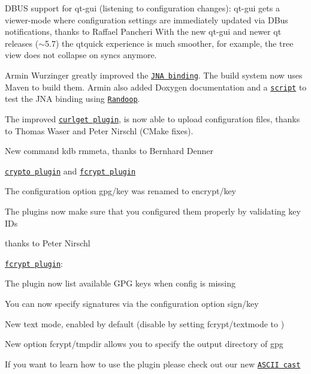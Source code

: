 \begin{DoxyItemize}
\item D\+B\+US support for qt-\/gui (listening to configuration changes)\+: qt-\/gui gets a viewer-\/mode where configuration settings are immediately updated via D\+Bus notifications, thanks to Raffael Pancheri With the new qt-\/gui and newer qt releases ($\sim$5.7) the qtquick experience is much smoother, for example, the tree view does not collapse on syncs anymore.
\item Armin Wurzinger greatly improved the \href{https://www.libelektra.org/bindings/jna}{\tt J\+NA binding}. The build system now uses Maven to build them. Armin also added Doxygen documentation and a \href{http://master.libelektra.org/scripts/randoop/randoop.in}{\tt script} to test the J\+NA binding using \href{https://randoop.github.io/randoop}{\tt Randoop}.
\item The improved \href{https://www.libelektra.org/plugins/curlget}{\tt curlget plugin}, is now able to upload configuration files, thanks to Thomas Waser and Peter Nirschl (C\+Make fixes).
\item New command {\ttfamily kdb rmmeta}, thanks to Bernhard Denner
\item \href{https://www.libelektra.org/plugins/crypto}{\tt crypto plugin} and \href{https://www.libelektra.org/plugins/fcrypt}{\tt fcrypt plugin}
\begin{DoxyItemize}
\item The configuration option {\ttfamily gpg/key} was renamed to {\ttfamily encrypt/key}
\item The plugins now make sure that you configured them properly by validating key I\+Ds
\item thanks to Peter Nirschl
\end{DoxyItemize}
\item \href{https://www.libelektra.org/plugins/fcrypt}{\tt fcrypt plugin}\+:
\begin{DoxyItemize}
\item The plugin now list available G\+PG keys when config is missing
\item You can now specify signatures via the configuration option {\ttfamily sign/key}
\item New text mode, enabled by default (disable by setting {\ttfamily fcrypt/textmode} to {})
\item New option {\ttfamily fcrypt/tmpdir} allows you to specify the output directory of {\ttfamily gpg}
\item If you want to learn how to use the plugin please check out our new \href{https://asciinema.org/a/153014}{\tt A\+S\+C\+II cast}

\end{DoxyItemize}
\end{DoxyItemize}
